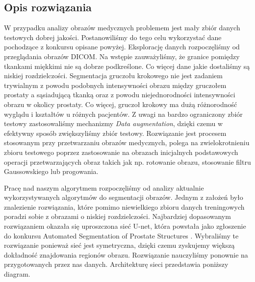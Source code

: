 \documentclass[a4paper,11pt,twoside]{report}
\theoremstyle{definition}
\begin{document}
\subsection{Opis rozwiązania}

W przypadku analizy obrazów medycznych problemem jest mały zbiór danych testowych dobrej jakości. Postanowiliśmy do tego celu wykorzystać dane pochodzące z konkursu opisane powyżej. Eksplorację danych rozpoczęliśmy od przeglądania obrazów DICOM. Na wstępie zauważyliśmy, że granice pomiędzy tkankami miękkimi nie są dobrze podkreślone. Co więcej dane jakie dostaliśmy są niskiej rozdzielczości. Segmentacja gruczołu krokowego nie jest zadaniem trywialnym z powodu podobnych intensywności obrazu między gruczołem prostaty a sąsiadującą tkanką oraz z powodu niejednorodności intensywności obrazu w okolicy prostaty. Co więcej, gruczoł krokowy ma dużą różnorodność wyglądu i kształtów u różnych pacjentów.
Z uwagi na bardzo ograniczony zbiór testowy zastosowaliśmy mechanizmy \textit{Data augmentation}, dzięki czemu w efektywny sposób zwiększyliśmy zbiór testowy. Rozwiązanie jest  procesem stosowanym przy przetwarzaniu obrazów medycznych, polega na zwielokrotnieniu zbioru testowego poprzez zastosowanie na obrazach inicjalnych podstawowych operacji przetwarzających obraz takich jak np. rotowanie obrazu, stosowanie filtru Gaussowskiego lub progowania.
\par
Pracę nad naszym algorytmem rozpoczęliśmy od analizy aktualnie wykorzystywanych algorytmów do segmentacji obrazów. Jednym z założeń było znalezienie rozwiązania, które pomimo niewielkiego zbioru danych treningowych poradzi sobie z obrazami o niskiej rozdzielczości. Najbardziej dopasowanym rozwiązaniem okazała się uproszczona sieć U-net, która powstała jako zgłoszenie do konkursu Automated Segmentation of Prostate Structures \cite{zgloszenie}. Wybraliśmy te rozwiązanie ponieważ sieć jest symetryczna, dzięki czemu zyskujemy większą dokładność znajdowania regionów obrazu. Rozwiązanie nauczyliśmy ponownie na przygotowanych przez nas danych. Architekturę sieci przedstawia poniższy diagram. 
\end{document}
